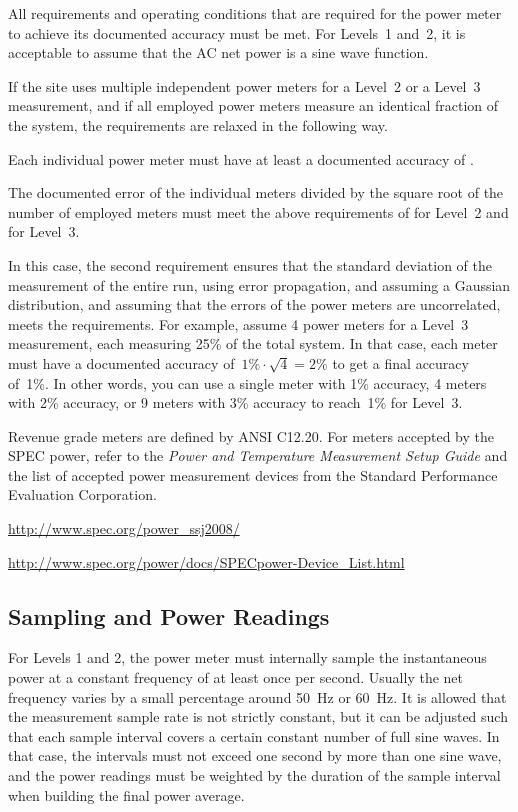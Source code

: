 All requirements and operating conditions that are required for the power meter to achieve its documented accuracy must be met.
For Levels~1 and~2, it is acceptable to assume that the AC net power is a sine wave function.

If the site uses multiple independent power meters for a Level~2 or a Level~3 measurement, and if all employed power meters measure an identical fraction of the system, the requirements are relaxed in the following way.
\begin{packed_item}
\item 
Each individual power meter must have at least a documented accuracy of \SpecAccuracyMeter{}.
\item
The documented error of the individual meters divided by the square root of the number of employed meters must meet the above requirements of \SpecAccuracyLTwo{} for Level~2 and \SpecAccuracyLThree{} for Level~3.
\end{packed_item}
In this case, the second requirement ensures that the standard deviation of the measurement of the entire run, using error propagation, and assuming a Gaussian distribution, and assuming that the errors of the power meters are uncorrelated, meets the requirements.
For example, assume 4 power meters for a Level~3 measurement, each measuring 25\% of the total system.
In that case, each meter must have a documented accuracy of~$1\% \cdot \sqrt{4} = 2\%$ to get a final accuracy of~1\%.
In other words, you can use a single meter with 1\% accuracy, 4 meters with 2\% accuracy, or 9 meters with 3\% accuracy to reach~1\% for Level~3.

Revenue grade meters are defined by ANSI C12.20.
For meters accepted by the SPEC power, refer to the {\itshape Power and Temperature Measurement Setup Guide \/} and the list of accepted power measurement devices from the Standard Performance Evaluation Corporation.
\begin{packed_item}
\item 
\url{http://www.spec.org/power_ssj2008/}
\item
\url{http://www.spec.org/power/docs/SPECpower-Device_List.html }
\end{packed_item}

\subsection{Sampling and Power Readings}
For Levels 1 and 2, the power meter must internally sample the instantaneous power at a constant frequency of at least once per second.
Usually the net frequency varies by a small percentage around 50~Hz or 60~Hz.
It is allowed that the measurement sample rate is not strictly constant, but it can be adjusted such that each sample interval covers a certain constant number of full sine waves.
In that case, the intervals must not exceed one second by more than one sine wave, and the power readings must be weighted by the duration of the sample interval when building the final power average.

